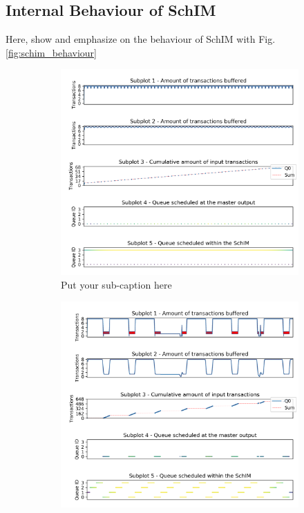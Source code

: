  \subsection{Internal Behaviour of SchIM}
    Here, show and emphasize on the behaviour of SchIM with Fig.\ref{fig:schim_behaviour}
    \begin{figure}
      \begin{subfigure}{.3\textwidth}
        \centering
        \includegraphics[scale=0.32]{../doc/experiments/buffering_4c_15_08_FP.png}  
        \caption{Put your sub-caption here}
        \label{fig:schim_behaviour_fp}
      \end{subfigure}
      \hfill
      \begin{subfigure}{.3\textwidth}
        \centering
        \includegraphics[scale=0.32]{../doc/experiments/buffering_4c_15_08_TDMA.png}  

\end{subfigure}
\end{figure}
